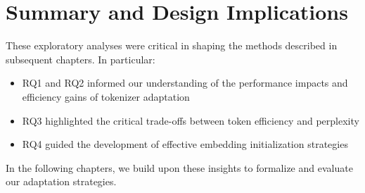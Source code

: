 \section{Summary and Design Implications}
\label{sec:exploration_summary}

These exploratory analyses were critical in shaping the methods described in subsequent chapters. In particular:
\begin{itemize}
    \item RQ1 and RQ2 informed our understanding of the performance impacts and efficiency gains of tokenizer adaptation
    \item RQ3 highlighted the critical trade-offs between token efficiency and perplexity
    \item RQ4 guided the development of effective embedding initialization strategies
\end{itemize}

In the following chapters, we build upon these insights to formalize and evaluate our adaptation strategies.
